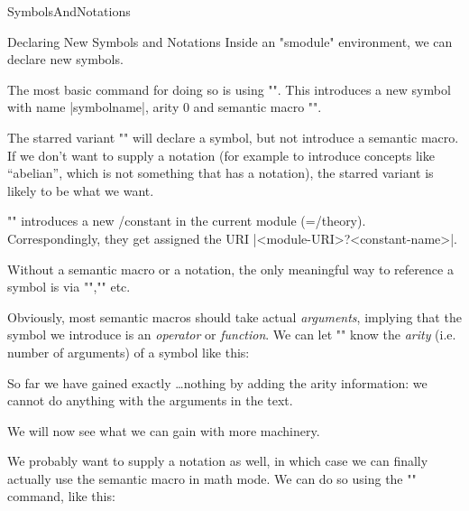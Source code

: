\begin{smodule}[ns=https://github.com/slatex/sTeX/doc]{SymbolsAndNotations}
\begin{sfragment}{Declaring New Symbols and Notations}
  Inside an \stexcode"smodule" environment, we can declare new \sTeX symbols.

\begin{function}{\symdecl}
  The most basic command for doing so is using \stexcode"". This
  introduces a new symbol with name |symbolname|, arity $0$ and semantic macro
  \stexcode"\symbolname".

  The starred variant \stexcode"" will declare a symbol, but not
  introduce a semantic macro.  If we don't want to supply a notation (for example to
  introduce concepts like ``abelian'', which is not something that has a notation), the
  starred variant is likely to be what we want.
\end{function}
\begin{mmtbox}
  \stexcode"\symdecl" introduces a new \omdoc/\mmt constant in the current module
  (=\omdoc/\mmt theory).  Correspondingly, they get assigned the URI
  |<module-URI>?<constant-name>|.
\end{mmtbox}

Without a semantic macro or a notation, the only meaningful way to reference a symbol is
via \stexcode"\symref",\stexcode"\symname" etc.


Obviously, most semantic macros should take actual \emph{arguments}, implying that the
symbol we introduce is an \emph{operator} or \emph{function}. We can let
\stexcode"\symdecl" know the \emph{arity} (i.e. number of arguments) of a symbol like
this:


So far we have gained exactly \ldots nothing by adding the arity information: we cannot do
anything with the arguments in the text.

We will now see what we can gain with more machinery.
    
\begin{function}{\notation}
  We probably want to supply a notation as well, in which case we can finally actually use
  the semantic macro in math mode.  We can do so using the \stexcode"\notation" command,
  like this: 
\end{function}


\end{sfragment}
\end{smodule}
